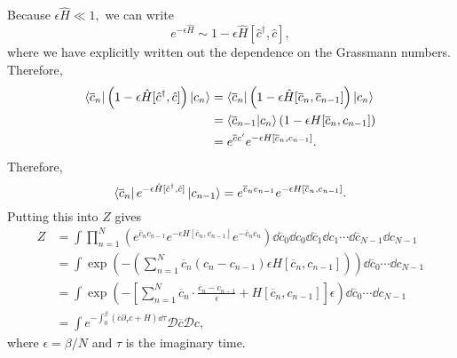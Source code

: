 \documentclass{article}
\numberwithin{equation}{section}
\begin{document}
Because $\epsilon \hat{H} \ll 1,$ we can write 
\begin{equation}
    e^{-\epsilon \hat{H}} \sim 1- \epsilon \hat{H}[\hat{c}^\dagger, \hat{c}],
\end{equation}
where we have explicitly written out the dependence on the Grassmann numbers. Therefore,
\begin{align}
    \bra{\overline{c}_n} \left(1 - \epsilon \hat{H}[\hat{c}^\dagger, \hat{c}]\right) \ket{c_n} &=\bra{\overline{c}_n} \left(1 - \epsilon \hat{H}[\overline{c}_n, \overline{c}_{n-1}]\right) \ket{c_n}  \\ 
    &= \bra{\overline{c}_{n-1}}\ket{c_n}\left(1 - \epsilon H[\overline{c}_n, c_{n-1}]\right) \\ 
    &= e^{\overline{c}c'} e^{-\epsilon H[\overline{c}_n, c_{n-1}]}.
\end{align}
Therefore,
\begin{equation}
    \bra{\overline{c}_n}e^{-\epsilon \hat{H}[\hat{c}^\dagger,\hat{c}]}\ket{c_{n-1}} = e^{\overline{c}_nc_{n-1}}e^{-\epsilon H[\overline{c}_n, c_{n-1}]}.
\end{equation}
Putting this into $Z$ gives 
\begin{align}
    Z &= \int \prod_{n=1}^N \left(e^{\overline{c}_nc_{n-1}}e^{-\epsilon H[\overline{c}_n, c_{n-1}]}e^{-\overline{c}_nc_n}\right) \dd{\overline{c}_0}\dd{c_0}\dd{\overline{c}_1}\dd{c_1}\cdots\dd{\overline{c}_{N-1}}\dd{c_{N-1}} \\
    &= \int \exp\left(-\left(\sum_{n=1}^N \overline{c}_n(c_{n}-c_{n-1})\epsilon H[\overline{c}_n, c_{n-1}]\right)\right) \dd{\overline{c}_0}\cdots \dd{c_{N-1}} \\
    &= \int \exp\left(-\left[\sum_{n=1}^N\overline{c}_n \cdot \frac{\overline{c}_n-c_{n-1}}{\epsilon} + H[\overline{c}_n, c_{n-1}]\right]\epsilon\right)\dd{\overline{c}_0}\cdots \dd{c_{N-1}} \\
    &= \int e^{-\int_0^\beta (\overline{c}\partial_\tau c + H)\dd{\tau}} \mathcal{D}\overline{c}\mathcal{D}c,
\end{align}
where $\epsilon = \beta/N$ and $\tau$ is the imaginary time.
\end{document}
